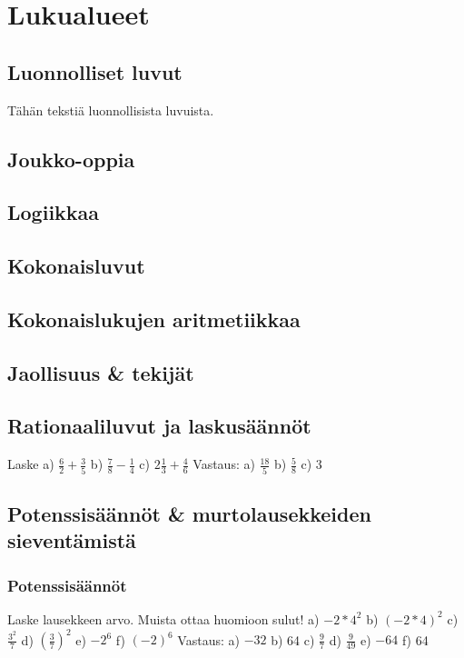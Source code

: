 


\part{Lukualueet}
\chapter{Luonnolliset luvut}

Tähän tekstiä luonnollisista luvuista.

\chapter{Joukko-oppia}
\chapter{Logiikkaa}
\chapter{Kokonaisluvut}
\chapter{Kokonaislukujen aritmetiikkaa}
\chapter{Jaollisuus \& tekijät}
\chapter{Rationaaliluvut ja laskusäännöt}

Laske %
a) $\frac{6}{2} + \frac{3}{5}$
b) $\frac{7}{8} - \frac{1}{4}$
c) $2 \frac{1}{3} + \frac{4}{6}$
Vastaus:
a) $\frac{18}{5}$
b) $\frac{5}{8}$
c) $3$

\chapter{Potenssisäännöt \& murtolausekkeiden sieventämistä}

\section{Potenssisäännöt}

Laske lausekkeen arvo. Muista ottaa huomioon sulut!
a) $-2*4^2$
b) $(-2*4)^2$
c) $\frac{3^2}{7}$
d) $\left( \frac{3}{7} \right)^2$
e) $-2^6$
f) $(-2)^6$
Vastaus:
a) $-32$
b) 64
c) $\frac{9}{7}$
d) $\frac{9}{49}$
e) $-64$
f) 64

